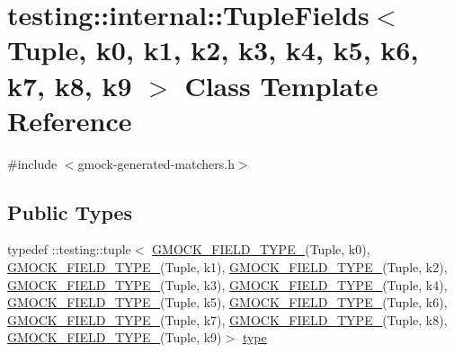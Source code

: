 \hypertarget{classtesting_1_1internal_1_1TupleFields}{}\section{testing\+::internal\+::Tuple\+Fields$<$ Tuple, k0, k1, k2, k3, k4, k5, k6, k7, k8, k9 $>$ Class Template Reference}
\label{classtesting_1_1internal_1_1TupleFields}


{\ttfamily \#include $<$gmock-\/generated-\/matchers.\+h$>$}

\subsection*{Public Types}
\begin{DoxyCompactItemize}
\item 
typedef \+::testing\+::tuple$<$ \mbox{\hyperlink{gmock-generated-matchers_8h_acf3e27de83a73f0d873da1cd471e505b}{G\+M\+O\+C\+K\+\_\+\+F\+I\+E\+L\+D\+\_\+\+T\+Y\+P\+E\+\_\+}}(Tuple, k0), \mbox{\hyperlink{gmock-generated-matchers_8h_acf3e27de83a73f0d873da1cd471e505b}{G\+M\+O\+C\+K\+\_\+\+F\+I\+E\+L\+D\+\_\+\+T\+Y\+P\+E\+\_\+}}(Tuple, k1), \mbox{\hyperlink{gmock-generated-matchers_8h_acf3e27de83a73f0d873da1cd471e505b}{G\+M\+O\+C\+K\+\_\+\+F\+I\+E\+L\+D\+\_\+\+T\+Y\+P\+E\+\_\+}}(Tuple, k2), \mbox{\hyperlink{gmock-generated-matchers_8h_acf3e27de83a73f0d873da1cd471e505b}{G\+M\+O\+C\+K\+\_\+\+F\+I\+E\+L\+D\+\_\+\+T\+Y\+P\+E\+\_\+}}(Tuple, k3), \mbox{\hyperlink{gmock-generated-matchers_8h_acf3e27de83a73f0d873da1cd471e505b}{G\+M\+O\+C\+K\+\_\+\+F\+I\+E\+L\+D\+\_\+\+T\+Y\+P\+E\+\_\+}}(Tuple, k4), \mbox{\hyperlink{gmock-generated-matchers_8h_acf3e27de83a73f0d873da1cd471e505b}{G\+M\+O\+C\+K\+\_\+\+F\+I\+E\+L\+D\+\_\+\+T\+Y\+P\+E\+\_\+}}(Tuple, k5), \mbox{\hyperlink{gmock-generated-matchers_8h_acf3e27de83a73f0d873da1cd471e505b}{G\+M\+O\+C\+K\+\_\+\+F\+I\+E\+L\+D\+\_\+\+T\+Y\+P\+E\+\_\+}}(Tuple, k6), \mbox{\hyperlink{gmock-generated-matchers_8h_acf3e27de83a73f0d873da1cd471e505b}{G\+M\+O\+C\+K\+\_\+\+F\+I\+E\+L\+D\+\_\+\+T\+Y\+P\+E\+\_\+}}(Tuple, k7), \mbox{\hyperlink{gmock-generated-matchers_8h_acf3e27de83a73f0d873da1cd471e505b}{G\+M\+O\+C\+K\+\_\+\+F\+I\+E\+L\+D\+\_\+\+T\+Y\+P\+E\+\_\+}}(Tuple, k8), \mbox{\hyperlink{gmock-generated-matchers_8h_acf3e27de83a73f0d873da1cd471e505b}{G\+M\+O\+C\+K\+\_\+\+F\+I\+E\+L\+D\+\_\+\+T\+Y\+P\+E\+\_\+}}(Tuple, k9)$>$ \mbox{\hyperlink{classtesting_1_1internal_1_1TupleFields_a5480877377ebc94bf3a6c6cab5c369bc}{type}}
\end{DoxyCompactItemize}
